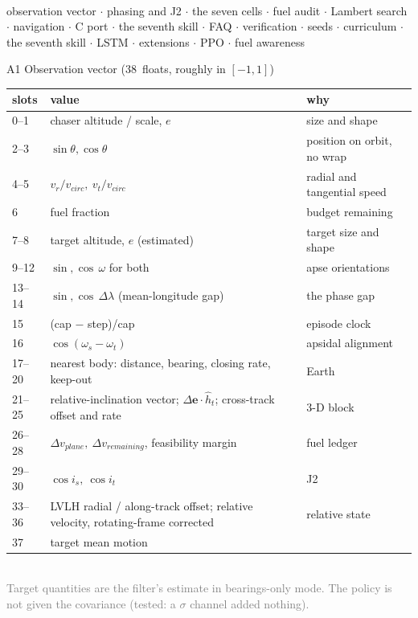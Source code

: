 \documentclass[aspectratio=169,11pt]{beamer}
\newcommand{\dv}{\ensuremath{\Delta v}}
\newcommand{\nObs}{38}
\begin{document}
\appendix
\begin{frame}[plain]\\[2mm]\small observation vector \;$\cdot$\; phasing and J2 \;$\cdot$\; the seven cells \;$\cdot$\; fuel audit \;$\cdot$\; Lambert search \;$\cdot$\; navigation \;$\cdot$\; C port \;$\cdot$\; the seventh skill \;$\cdot$\; FAQ \;$\cdot$\; verification \;$\cdot$\; seeds \;$\cdot$\; curriculum \;$\cdot$\; the seventh skill \;$\cdot$\; LSTM \;$\cdot$\; extensions \;$\cdot$\; PPO \;$\cdot$\; fuel awareness\end{frame}

\begin{frame}{A1 \; Observation vector (\nObs\ floats, roughly in $[-1,1]$)}
\tiny
\begin{tabular}{@{}lll@{}}
\toprule
slots & value & why\\
\midrule
0--1 & chaser altitude / scale, $e$ & size and shape\\
2--3 & $\sin\theta,\cos\theta$ & position on orbit, no wrap\\
4--5 & $v_r/v_{circ},\ v_t/v_{circ}$ & radial and tangential speed\\
6 & fuel fraction & budget remaining\\
7--8 & target altitude, $e$ (estimated) & target size and shape\\
9--12 & $\sin,\cos\,\omega$ for both & apse orientations\\
13--14 & $\sin,\cos\,\Delta\lambda$ (mean-longitude gap) & the phase gap\\
15 & (cap $-$ step)/cap & episode clock\\
16 & $\cos(\omega_s-\omega_t)$ & apsidal alignment\\
17--20 & nearest body: distance, bearing, closing rate, keep-out & Earth\\
21--25 & relative-inclination vector; $\Delta\mathbf e\cdot\hat h_t$; cross-track offset and rate & 3-D block\\
26--28 & $\dv_{plane},\ \dv_{remaining}$, feasibility margin & fuel ledger\\
29--30 & $\cos i_s,\ \cos i_t$ & J2\\
33--36 & LVLH radial / along-track offset; relative velocity, rotating-frame corrected & relative state\\
37 & target mean motion & \\
\bottomrule
\end{tabular}
\\[1mm]\textcolor{grey}{Target quantities are the filter's estimate in bearings-only mode. The policy is not given the covariance (tested: a $\sigma$ channel added nothing).}
\end{frame}
\end{document}
